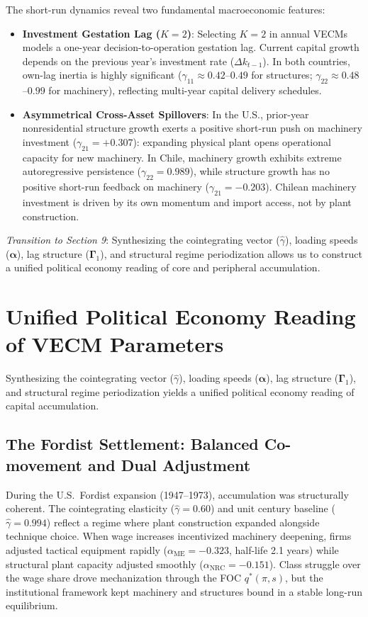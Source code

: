 \documentclass[11pt,a4paper]{article}
\begin{document}
The short-run dynamics reveal two fundamental macroeconomic features:
\begin{itemize}
    \item \textbf{Investment Gestation Lag ($K=2$)}: Selecting $K=2$ in annual VECMs models a one-year decision-to-operation gestation lag. Current capital growth depends on the previous year's investment rate ($\Delta k_{t-1}$). In both countries, own-lag inertia is highly significant ($\gamma_{11} \approx 0.42$--$0.49$ for structures; $\gamma_{22} \approx 0.48$--$0.99$ for machinery), reflecting multi-year capital delivery schedules.
    \item \textbf{Asymmetrical Cross-Asset Spillovers}: In the U.S., prior-year nonresidential structure growth exerts a positive short-run push on machinery investment ($\gamma_{21} = +0.307$): expanding physical plant opens operational capacity for new machinery. In Chile, machinery growth exhibits extreme autoregressive persistence ($\gamma_{22} = 0.989$), while structure growth has no positive short-run feedback on machinery ($\gamma_{21} = -0.203$). Chilean machinery investment is driven by its own momentum and import access, not by plant construction.
\end{itemize}

\textit{Transition to Section 9}: Synthesizing the cointegrating vector ($\hat{\gamma}$), loading speeds ($\boldsymbol{\alpha}$), lag structure ($\boldsymbol{\Gamma}_1$), and structural regime periodization allows us to construct a unified political economy reading of core and peripheral accumulation.

\FloatBarrier
\section{Unified Political Economy Reading of VECM Parameters}

Synthesizing the cointegrating vector ($\hat{\gamma}$), loading speeds ($\boldsymbol{\alpha}$), lag structure ($\boldsymbol{\Gamma}_1$), and structural regime periodization yields a unified political economy reading of capital accumulation.

\subsection{The Fordist Settlement: Balanced Co-movement and Dual Adjustment}
During the U.S.\ Fordist expansion (1947--1973), accumulation was structurally coherent. The cointegrating elasticity ($\hat{\gamma} = 0.60$) and unit century baseline ($\hat{\gamma} = 0.994$) reflect a regime where plant construction expanded alongside technique choice. When wage increases incentivized machinery deepening, firms adjusted tactical equipment rapidly ($\alpha_{\text{ME}} = -0.323$, half-life 2.1 years) while structural plant capacity adjusted smoothly ($\alpha_{\text{NRC}} = -0.151$). Class struggle over the wage share drove mechanization through the FOC $q^*(\pi, s)$, but the institutional framework kept machinery and structures bound in a stable long-run equilibrium.
\end{document}
